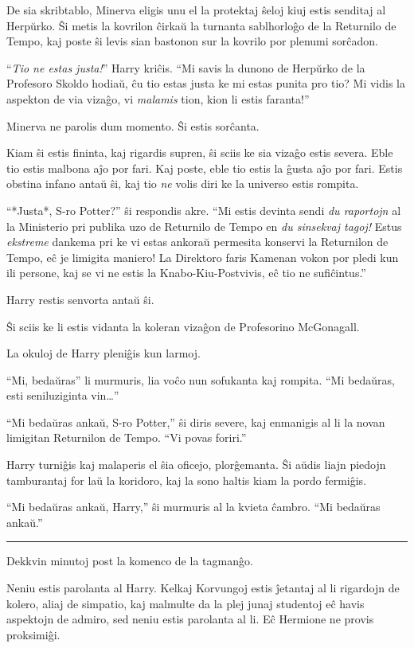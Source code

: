 De sia skribtablo, Minerva eligis unu el la protektaj ŝeloj kiuj
estis senditaj al Herpŭrko. Ŝi metis la kovrilon ĉirkaŭ la turnanta
sablhorloĝo de la Returnilo de Tempo, kaj poste ŝi levis sian bastonon
sur la kovrilo por plenumi sorĉadon.

``\emph{Tio ne estas justa!}'' Harry kriĉis. ``Mi savis la dunono de
Herpŭrko de la Profesoro Skoldo hodiaŭ, ĉu tio estas justa ke mi estas
punita pro tio? Mi vidis la aspekton de via vizaĝo, vi \emph{malamis}
tion, kion li estis faranta!''

Minerva ne parolis dum momento. Ŝi estis sorĉanta.

Kiam ŝi estis fininta, kaj rigardis supren, ŝi sciis ke sia vizaĝo
estis severa. Eble tio estis malbona aĵo por fari. Kaj poste, eble tio
estis la ĝusta aĵo por fari. Estis obstina infano antaŭ ŝi, kaj tio
\emph{ne} volis diri ke la universo estis rompita.

``*Justa*, S-ro Potter?'' ŝi respondis akre. ``Mi estis devinta sendi
\emph{du raportojn} al la Ministerio pri publika uzo de Returnilo de
Tempo en \emph{du sinsekvaj tagoj!} Estus \emph{ekstreme} dankema pri
ke vi estas ankoraŭ permesita konservi la Returnilon de Tempo, eĉ je
limigita maniero! La Direktoro faris Kamenan vokon por pledi kun ili
persone, kaj se vi ne estis la Knabo-Kiu-Postvivis, eĉ tio ne
sufiĉintus.''

Harry restis senvorta antaŭ ŝi.

Ŝi sciis ke li estis vidanta la koleran vizaĝon de Profesorino McGonagall.

La okuloj de Harry pleniĝis kun larmoj.

``Mi, bedaŭras'' li murmuris, lia voĉo nun sofukanta kaj rompita. ``Mi
bedaŭras, esti seniluziginta vin\ldots''

``Mi bedaŭras ankaŭ, S-ro Potter,'' ŝi diris severe, kaj enmanigis al
li la novan limigitan Returnilon de Tempo. ``Vi povas foriri.''

Harry turniĝis kaj malaperis el ŝia oficejo, plorĝemanta. Ŝi aŭdis
liajn piedojn tamburantaj for laŭ la koridoro, kaj la sono haltis kiam
la pordo fermiĝis.

``Mi bedaŭras ankaŭ, Harry,'' ŝi murmuris al la kvieta ĉambro. ``Mi
bedaŭras ankaŭ.''

\begin{center}\rule{3in}{0.4pt}\end{center}

Dekkvin minutoj post la komenco de la tagmanĝo.

Neniu estis parolanta al Harry. Kelkaj Korvungoj estis ĵetantaj al li
rigardojn de kolero, aliaj de simpatio, kaj malmulte da la plej junaj
studentoj eĉ havis aspektojn de admiro, sed neniu estis parolanta al
li. Eĉ Hermione ne provis proksimiĝi.

